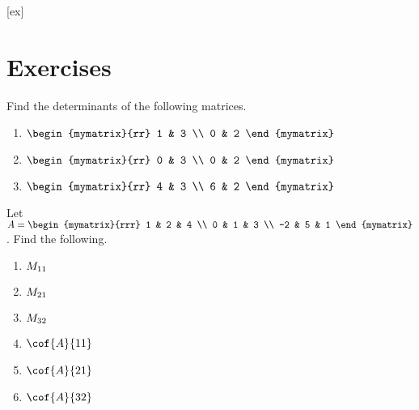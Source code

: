 [ex]
\section*{Exercises}

\begin{enumialphparenastyle}

\begin{ex} Find the determinants of the following matrices.

\begin{enumerate}
\item $\begin{mymatrix}{rr}
1 & 3 \\
0 & 2
\end{mymatrix}$

\item $\begin{mymatrix}{rr}
0 & 3 \\
0 & 2
\end{mymatrix}$

\item $\begin{mymatrix}{rr}
4 & 3 \\
6 & 2
\end{mymatrix}$
\end{enumerate}
\end{ex}

\begin{ex} Let $A = \begin{mymatrix}{rrr}
1 & 2 & 4 \\
0 & 1 & 3 \\
-2 & 5 & 1 
\end{mymatrix}$. Find the following.
\begin{enumerate}
\item $\minor{A}{11}$
\item $\minor{A}{21}$
\item $\minor{A}{32}$
\item $\cof{A}{11}$
\item $\cof{A}{21}$
\item $\cof{A}{32}$
\end{enumerate}
\end{ex}


\end{enumialphparenastyle}
